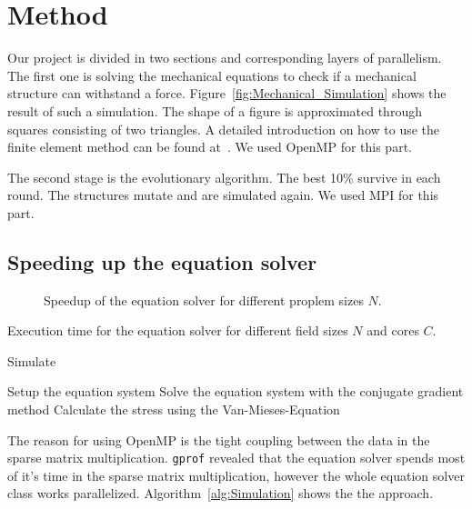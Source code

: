 \documentclass[12pt]{article}
\begin{document}
\section{Method}

Our project is divided in two sections and corresponding layers of parallelism. The first one is solving the mechanical equations to check if a mechanical structure can withstand a force. Figure~\ref{fig:Mechanical_Simulation} shows the result of such a simulation. The shape of a figure is approximated through squares consisting of two triangles. A detailed introduction on how to use the finite element method can be found at~\cite{Nikishkov2004}. We used OpenMP for this part.


The second stage is the evolutionary algorithm. The best 10\% survive in each round. The structures mutate and are simulated again. We used MPI for this part.

\subsection{Speeding up the equation solver}

\begin{figure}[p]
    \centering
    
    \caption{Speedup of the equation solver for different proplem sizes $N$.}
    \label{fig:SpeedupSimulation}
\end{figure}

\begin{table}[p]
    \centering
    
    \caption{Execution time for the equation solver for different field sizes $N$ and cores $C$.}
    \label{tab:SpeedupSimulation}
\end{table}

\begin{algorithm}[p]
    \caption{Simulate}
    \begin{algorithmic}
        \STATE Setup the equation system
        \STATE Solve the equation system with the conjugate gradient method
        \STATE Calculate the stress using the Van-Mieses-Equation
    \end{algorithmic}
    \label{alg:Simulation}
\end{algorithm}

The reason for using OpenMP is the tight coupling between the data in the sparse matrix multiplication. \texttt{gprof} revealed that the equation solver spends most of it's time in the sparse matrix multiplication, however the whole equation solver class works parallelized. Algorithm~\ref{alg:Simulation} shows the the approach.
\end{document}
